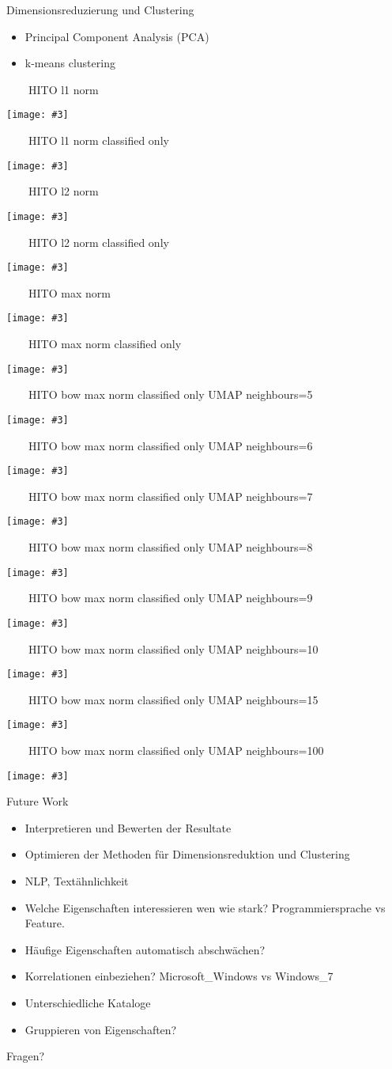 \documentclass[aspectratio=1610]{beamer}
\newcommand{\imageslide}[4][]
{
\begin{frame}[plain]{~~~~#2}
\vspace{0.2em}
\begin{center}
\centering\texttt{[image: \#3]}
\end{center}
#1
\note{#4}
\end{frame}
}
\begin{document}
\begin{frame}{Dimensionsreduzierung und Clustering}
\begin{itemize}
\item Principal Component Analysis (PCA)
\item k-means clustering
\end{itemize}
\end{frame}

\imageslide{HITO l1 norm}{img/cluster-l1.pdf}{}
\imageslide{HITO l1 norm classified only}{img/cluster-classifiedonly-l1.pdf}{}
\imageslide{HITO l2 norm}{img/cluster-l2.pdf}{}
\imageslide{HITO l2 norm classified only}{img/cluster-classifiedonly-l2.pdf}{}
\imageslide{HITO max norm}{img/cluster-max.pdf}{}
\imageslide{HITO max norm classified only}{img/cluster-classifiedonly-max.pdf}{}

\imageslide{HITO bow max norm classified only UMAP neighbours=5}{img/cluster-bagofwords-classifiedonly-umap-n5-max.pdf}{}
\imageslide{HITO bow max norm classified only UMAP neighbours=6}{img/cluster-bagofwords-classifiedonly-umap-n6-max.pdf}{}
\imageslide{HITO bow max norm classified only UMAP neighbours=7}{img/cluster-bagofwords-classifiedonly-umap-n7-max.pdf}{}
\imageslide{HITO bow max norm classified only UMAP neighbours=8}{img/cluster-bagofwords-classifiedonly-umap-n8-max.pdf}{}
\imageslide{HITO bow max norm classified only UMAP neighbours=9}{img/cluster-bagofwords-classifiedonly-umap-n9-max.pdf}{}
\imageslide{HITO bow max norm classified only UMAP neighbours=10}{img/cluster-bagofwords-classifiedonly-umap-n10-max.pdf}{}
\imageslide{HITO bow max norm classified only UMAP neighbours=15}{img/cluster-bagofwords-classifiedonly-umap-max.pdf}{}
\imageslide{HITO bow max norm classified only UMAP neighbours=100}{img/cluster-bagofwords-classifiedonly-umap-n100-max.pdf}{}

\begin{frame}{Future Work}
\begin{itemize}
\vspace{1em}
\item Interpretieren und Bewerten der Resultate
\pause
\item Optimieren der Methoden für Dimensionsreduktion und Clustering
\pause
\item NLP, Textähnlichkeit
\pause
\item Welche Eigenschaften interessieren wen wie stark? Programmiersprache vs Feature.
\pause
\item Häufige Eigenschaften automatisch abschwächen?
\pause
\item Korrelationen einbeziehen? Microsoft\_Windows vs Windows\_7
\pause
\item Unterschiedliche Kataloge
\pause
\item Gruppieren von Eigenschaften?
\end{itemize}
\end{frame}

\begin{frame}{Fragen?}
\end{frame}
\end{document}
